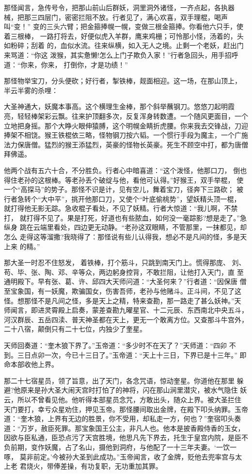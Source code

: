 那怪闻言，急传号令，把那山前山后群妖，洞里洞外诸怪，一齐点起，各执器
械，把那三四层门，密密拦阻不放。行者见了，满心欢喜，双手理棍，喝声叫“变！”
变的三头六臂；把金箍捧幌一幌，变做三根金箍捧。你看他六只手，使着三根棒，
一路打将去，好便似虎入羊群，鹰来鸡栅；可怜那小怪，汤着的，头如粉碎；刮着
的，血似水流。往来纵横，如入无人之境。止剩一个老妖，赶出门来骂道：“你这
泼猴，其实惫懒!怎么上门子欺负入家！”行者急回头，用手招呼道：“你来，你来，
打倒你，才是功绩！”

那怪物举宝刀，分头便砍；好行者，掣铁棒，觌面相迎。这一场，在那山顶上，
半云半雾的杀哩：

大圣神通大，妖魔本事高。这个横理生金棒，那个斜举蘸钢刀。悠悠刀起明霞
亮，轻轻棒架彩云飘。往来护顶翻多次，反复浑身转数遭。一个随风更面目，一个
立地把身摇。那个大睁火眼伸猿膊，这个明幌金睛折虎腰。你来我去交锋战，刀迎
捧架不相饶。猴王铁棍依三略，怪物钢刀按六韬。一个惯行手段为魔主，一个广施
法力保唐僧。猛烈的猴王添猛烈，英豪的怪物长英豪。死生不顾空中打，都为唐僧
拜佛遥。

他两个战有五六十合，不分胜负。行者心中暗喜道：“这个泼怪，他那口刀，
倒也得住老孙的这根棒。等老孙丢个破绽与他，看他可认得。”好猴王，双手举棍，
使一个“高探马”的势子。那怪不识是计，见有空儿，舞着宝刀，径奔下三路砍；
被行者急转个“大中平”，挑开他那口刀，又使个“叶底偷桃势”，望妖精头顶一棍，
就打得他无影无踪。急收棍子看处，不见了妖精。行者大惊道：“我儿啊，不禁打，
就打得不见了。果是打死，好道也有些脓血，如何没一毫踪影?想是走了。”急纵身
跳在云端里看处，四边更无动静。“老孙这双眼睛，不管那里，一抹都见，却怎么
走得这等溜撒?我晓得了：那怪说有些儿认得我，想必不是凡间的怪，多是天上来
的精。”

那大圣一时忍不住怒发，着铁棒，打个筋斗，只跳到南天门上。慌得那庞、
刘、苟、毕、张、陶、邓、辛等众，两边躬身控背，不敢拦阻，让他打入天门，直
至通明殿下。早有张、葛、许、邱四大天师问道：“大圣何来？”行者道：“因保唐
僧至宝象国，有一妖魔，欺骗国女，伤害吾师，老孙与他赌斗。正斗间，不见了这
怪。想那怪不是凡间之怪，多是天上之精，特来查勘，那一路走了甚么妖神。”天
师闻言，即进灵霄殿上启奏，蒙差查勘九曜星官、十二元辰、东西南北中央五斗，
河汉群辰、五岳四渎、普天神圣都在天上，更无一个敢离方位。又查那斗牛宫外，
二十八宿，颠倒只有二十七位，内独少了奎星。

天师回奏道：“奎木狼下界了。”玉帝道：“多少时不在天了？”天师道：“四卯
不到。三日点卯一次，今已十三日了。”玉帝道：“天上十三日，下界已是十三年。”
即命本部收他上界。

那二十七宿星员，领了旨意，出了天门，各念咒语，惊动奎星。你道他在那里
躲避?他原来是孙大圣大闹天宫时打怕了的神将，闪在那山涧里潜灾，被水气隐住
妖云，所以不曾看见他。他听得本部星员念咒，方敢出头，随众上界。被大圣拦住
天门要打，幸亏众星劝住，押见玉帝。那怪腰间取出金牌，在殿下叩头纳罪。玉帝
道：“奎木狼，上界有无边的胜景，你不受用，却私走一方，何也？”奎宿叩头奏
道：“万岁，赦臣死罪。那宝象国王公主，非凡人也。他本是披香殿侍香的玉女，
因欲与臣私通，臣恐点污了天宫胜境，他思凡先下界去，托生于皇宫内院，是臣不
负前期，变作妖魔，占了名山，摄他到洞府，与他配了一十三年夫妻。‘一饮一啄，
莫非前定。’今被孙大圣到此成功。”玉帝闻言，收了金牌，贬他去兜率宫与太上老
君烧火，带俸差操，有功复职，无功重加其罪。

